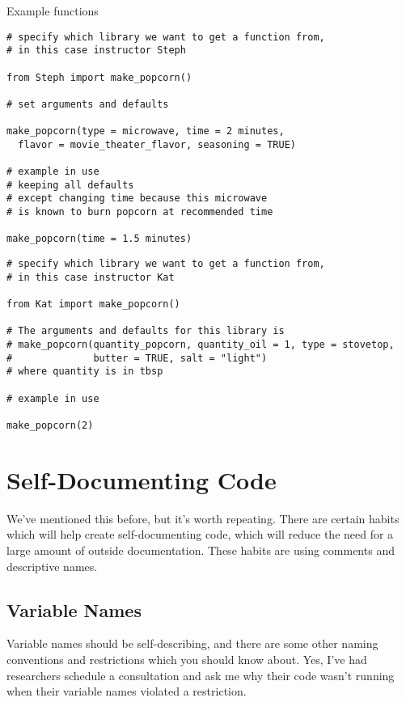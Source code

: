 \documentclass[
]{book}
\begin{document}
Example functions

\begin{verbatim}
# specify which library we want to get a function from, 
# in this case instructor Steph

from Steph import make_popcorn()

# set arguments and defaults

make_popcorn(type = microwave, time = 2 minutes, 
  flavor = movie_theater_flavor, seasoning = TRUE)

# example in use
# keeping all defaults
# except changing time because this microwave 
# is known to burn popcorn at recommended time

make_popcorn(time = 1.5 minutes)
\end{verbatim}

\begin{verbatim}
# specify which library we want to get a function from, 
# in this case instructor Kat

from Kat import make_popcorn()

# The arguments and defaults for this library is
# make_popcorn(quantity_popcorn, quantity_oil = 1, type = stovetop, 
#              butter = TRUE, salt = "light")
# where quantity is in tbsp

# example in use

make_popcorn(2)
\end{verbatim}

\chapter{Self-Documenting Code}\label{self-documenting-code}

We've mentioned this before, but it's worth repeating. There are certain habits which will help create self-documenting code, which will reduce the need for a large amount of outside documentation. These habits are using comments and descriptive names.

\section{Variable Names}\label{variable-names}

Variable names should be self-describing, and there are some other naming conventions and restrictions which you should know about. Yes, I've had researchers schedule a consultation and ask me why their code wasn't running when their variable names violated a restriction.
\end{document}
